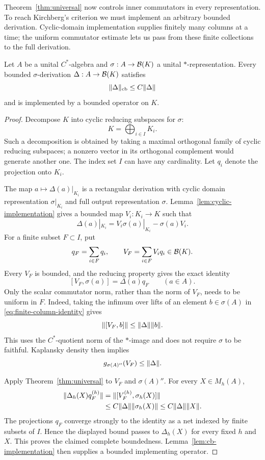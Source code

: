 Theorem~\ref{thm:universal} now controls inner commutators in every
representation. To reach Kirchberg's criterion we must implement an
arbitrary bounded derivation. Cyclic-domain implementation supplies
finitely many columns at a time; the uniform commutator estimate lets
us pass from these finite collections to the full derivation.

\begin{proposition}\label{prop:all-derivations}
Let $A$ be a unital $C^*$-algebra and $\sigma:A\to\mathcal B(K)$ a unital
$*$-representation.  Every bounded $\sigma$-derivation
$\Delta:A\to\mathcal B(K)$ satisfies
\[
 \lVert\Delta\rVert_{\mathrm{cb}}\le C\lVert\Delta\rVert
\]
and is implemented by a bounded operator on $K$.
\end{proposition}

\begin{proof}
Decompose $K$ into cyclic reducing subspaces for $\sigma$:
\[
 K=\bigoplus_{i\in I}K_i.
\]
Such a decomposition is obtained by taking a maximal orthogonal family
of cyclic reducing subspaces; a nonzero vector in its orthogonal
complement would generate another one.  The index set $I$ can have any
cardinality.  Let $q_i$ denote the projection onto $K_i$.

The map $a\mapsto\Delta(a)|_{K_i}$ is a rectangular derivation with cyclic
domain representation $\sigma|_{K_i}$ and full output representation
$\sigma$.  Lemma~\ref{lem:cyclic-implementation} gives a bounded map
$V_i:K_i\to K$ such that
\[
 \Delta(a)|_{K_i}=V_i\sigma(a)|_{K_i}-\sigma(a)V_i.
\]
For a finite subset $F\subset I$, put
\[
 q_F=\sum_{i\in F}q_i,
 \qquad V_F=\sum_{i\in F}V_iq_i\in\mathcal B(K).
\]
Every $V_F$ is bounded, and the reducing property gives the exact identity
\begin{equation}\label{eq:finite-column-identity}
 [V_F,\sigma(a)]=\Delta(a)q_F\qquad(a\in A).
\end{equation}
Only the scalar commutator norm, rather than the norm of $V_F$, needs to
be uniform in $F$.  Indeed, taking the infimum over lifts of an element
$b\in\sigma(A)$ in \eqref{eq:finite-column-identity} gives
\[
 \lVert[V_F,b]\rVert\le\lVert\Delta\rVert\lVert b\rVert.
\]
This uses the $C^*$-quotient norm of the $*$-image and does not require
$\sigma$ to be faithful.  Kaplansky density then implies
\[
 g_{\sigma(A)''}(V_F)\le\lVert\Delta\rVert.
\]

Apply Theorem~\ref{thm:universal} to $V_F$ and $\sigma(A)''$.  For every
$X\in M_h(A)$,
\begin{align*}
 \lVert\Delta_h(X)q_F^{(h)}\rVert
   &=\lVert[V_F^{(h)},\sigma_h(X)]\rVert\\
   &\le C\lVert\Delta\rVert\lVert\sigma_h(X)\rVert
    \le C\lVert\Delta\rVert\lVert X\rVert.
\end{align*}
The projections $q_F$ converge strongly to the identity as a net indexed
by finite subsets of $I$.  Hence the displayed bound passes to
$\Delta_h(X)$ for every fixed $h$ and $X$.  This proves the claimed
complete boundedness.  Lemma~\ref{lem:cb-implementation} then supplies a
bounded implementing operator.
\end{proof}

